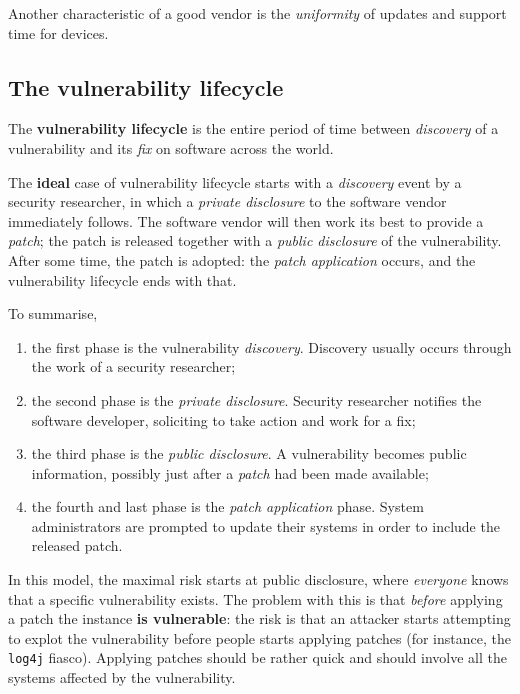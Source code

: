 \documentclass[10pt]{extreport}
\begin{document}
Another characteristic of a good vendor is the \emph{uniformity} of updates and
support time for devices.


\subsection{The vulnerability lifecycle}

The \textbf{vulnerability lifecycle} is the entire period of time between
\emph{discovery} of a vulnerability and its \emph{fix} on software across the
world.

The \textbf{ideal} case of vulnerability lifecycle starts with a
\emph{discovery} event by a security researcher, in which a \emph{private
disclosure} to the software vendor immediately follows. The software vendor
will then work its best to provide a \emph{patch}; the patch is released
together with a \emph{public disclosure} of the vulnerability. After some time,
the patch is adopted: the \emph{patch application} occurs, and the
vulnerability lifecycle ends with that.

To summarise,

\begin{enumerate}
    \item the first phase is the vulnerability \emph{discovery}. Discovery
        usually occurs through the work of a security researcher;
    \item the second phase is the \emph{private disclosure}. Security
        researcher notifies the software developer, soliciting to take action
        and work for a fix;
    \item the third phase is the \emph{public disclosure}. A vulnerability
        becomes public information, possibly just after a \emph{patch} had been
        made available;
    \item the fourth and last phase is the \emph{patch application} phase.
        System administrators are prompted to update their systems in order to
        include the released patch.
\end{enumerate}


In this model, the maximal risk starts at public disclosure, where
\emph{everyone} knows that a specific vulnerability exists. The problem with
this is that \emph{before} applying a patch the instance \textbf{is
vulnerable}: the risk is that an attacker starts attempting to explot the
vulnerability before people starts applying patches (for instance, the
\texttt{log4j} fiasco). Applying patches should be rather quick and should
involve all the systems affected by the vulnerability.
\end{document}
